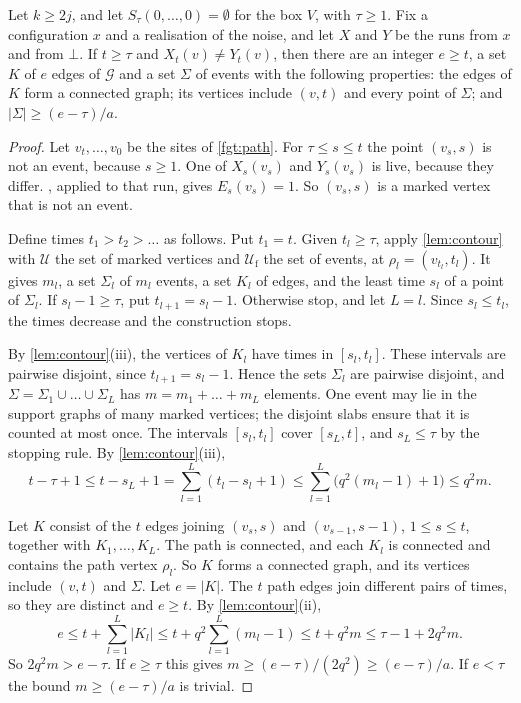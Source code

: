 \begin{lemma}[packing]\label{fgt:packing}
Let $k\ge2j$, and let $S_\tau(0,\dots,0)=\emptyset$ for the box $V$, with $\tau\ge1$. Fix a configuration $x$ and a realisation of the noise, and let $X$ and $Y$ be the runs from $x$ and from $\bot$. If $t\ge\tau$ and $X_t(v)\ne Y_t(v)$, then there are an integer $e\ge t$, a set $K$ of $e$ edges of $\mathcal G$ and a set $\Sigma$ of events with the following properties: the edges of $K$ form a connected graph; its vertices include $(v,t)$ and every point of $\Sigma$; and $|\Sigma|\ge(e-\tau)/a$.
\end{lemma}

\begin{proof}
Let $v_t,\dots,v_0$ be the sites of \cref{fgt:path}. For $\tau\le s\le t$ the point $(v_s,s)$ is not an event, because $s\ge1$. One of $X_s(v_s)$ and $Y_s(v_s)$ is live, because they differ. , applied to that run, gives $E_s(v_s)=1$. So $(v_s,s)$ is a marked vertex that is not an event.

Define times $t_1>t_2>\dots$ as follows. Put $t_1=t$. Given $t_l\ge\tau$, apply \cref{lem:contour} with $\mathcal U$ the set of marked vertices and $\mathcal U_{\mathrm f}$ the set of events, at $\rho_l=(v_{t_l},t_l)$. It gives $m_l$, a set $\Sigma_l$ of $m_l$ events, a set $K_l$ of edges, and the least time $s_l$ of a point of $\Sigma_l$. If $s_l-1\ge\tau$, put $t_{l+1}=s_l-1$. Otherwise stop, and let $L=l$. Since $s_l\le t_l$, the times decrease and the construction stops.

By \cref{lem:contour}(iii), the vertices of $K_l$ have times in $[s_l,t_l]$. These intervals are pairwise disjoint, since $t_{l+1}=s_l-1$. Hence the sets $\Sigma_l$ are pairwise disjoint, and $\Sigma=\Sigma_1\cup\dots\cup\Sigma_L$ has $m=m_1+\dots+m_L$ elements. One event may lie in the support graphs of many marked vertices; the disjoint slabs ensure that it is counted at most once. The intervals $[s_l,t_l]$ cover $[s_L,t]$, and $s_L\le\tau$ by the stopping rule. By \cref{lem:contour}(iii),
\[
t-\tau+1\le t-s_L+1=\sum_{l=1}^L(t_l-s_l+1)\le\sum_{l=1}^L\bigl(q^2(m_l-1)+1\bigr)\le q^2m.
\]

Let $K$ consist of the $t$ edges joining $(v_s,s)$ and $(v_{s-1},s-1)$, $1\le s\le t$, together with $K_1,\dots,K_L$. The path is connected, and each $K_l$ is connected and contains the path vertex $\rho_l$. So $K$ forms a connected graph, and its vertices include $(v,t)$ and $\Sigma$. Let $e=|K|$. The $t$ path edges join different pairs of times, so they are distinct and $e\ge t$. By \cref{lem:contour}(ii),
\[
e\le t+\sum_{l=1}^L|K_l|\le t+q^2\sum_{l=1}^L(m_l-1)\le t+q^2m\le\tau-1+2q^2m.
\]
So $2q^2m>e-\tau$. If $e\ge\tau$ this gives $m\ge(e-\tau)/(2q^2)\ge(e-\tau)/a$. If $e<\tau$ the bound $m\ge(e-\tau)/a$ is trivial.
\end{proof}

